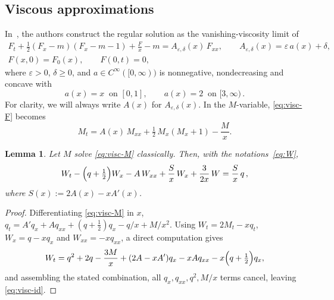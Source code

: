 \documentclass[12pt]{amsart}
\numberwithin{equation}{section}
\theoremstyle{plain}
\newtheorem{lemma}[theorem]{Lemma}
\theoremstyle{definition}
\newcommand{\eps}{\varepsilon}
\begin{document}
\subsection{Viscous approximations}
In~\cite{TV}, the authors construct the regular solution as the
vanishing-viscosity limit of
\begin{equation}\label{eq:visc-F}
	\begin{gathered}
		F_t + \tfrac12 (F_x-m)(F_x-m-1) + \frac{F}{x}-m =
		A_{\eps,\delta}(x)\,F_{xx},
		\qquad A_{\eps,\delta}(x)=\eps\,a(x)+\delta,\\
		F(x,0)=F_0(x),\qquad F(0,t)=0,
	\end{gathered}
\end{equation}
where $\eps>0$, $\delta\ge0$, and $a\in C^\infty([0,\infty))$ is nonnegative,
nondecreasing and concave with
\begin{equation}\label{eq:cutoff}
	a(x)=x \ \text{ on }[0,1],\qquad a(x)=2 \ \text{ on }[3,\infty) \,.
\end{equation}
For clarity, we will always write $A(x)$ for $A_{\eps,\delta}(x)$.
In
the $M$-variable, \eqref{eq:visc-F} becomes
\begin{equation}\label{eq:visc-M}
	M_t=A(x)\,M_{xx}+\tfrac12\,M_x(M_x+1)-\frac{M}{x}.
\end{equation}

\begin{lemma}\label{lem:viscous}
	Let $M$ solve \eqref{eq:visc-M} classically. Then,
	with the notations~\eqref{eq:W},
	\begin{equation}\label{eq:visc-id}
		W_t-\Bigl(q+\tfrac12\Bigr)W_x-A\,W_{xx}
		+\frac{S}{x}\,W_x+\frac{3}{2x}\,W
		=\frac{S}{x}\,q\,,
	\end{equation}
	where $S(x):=2A(x)-xA'(x)$.
\end{lemma}

\begin{proof}
	Differentiating \eqref{eq:visc-M} in $x$,
	$q_t=A'q_x+Aq_{xx}+(q+\tfrac12)q_x-q/x+M/x^2$. Using
	$W_t=2M_t-xq_t$, $W_x=q-xq_x$ and $W_{xx}=-xq_{xx}$, a direct
	computation gives
	\[
		W_t=q^2+2q-\frac{3M}{x}+(2A-xA')q_x-xAq_{xx}-x\Bigl(q+\tfrac12\Bigr)q_x ,
	\]
	and assembling the stated combination, all $q_x,q_{xx},q^2,M/x$ terms cancel,
	leaving \eqref{eq:visc-id}.
\end{proof}
\end{document}
